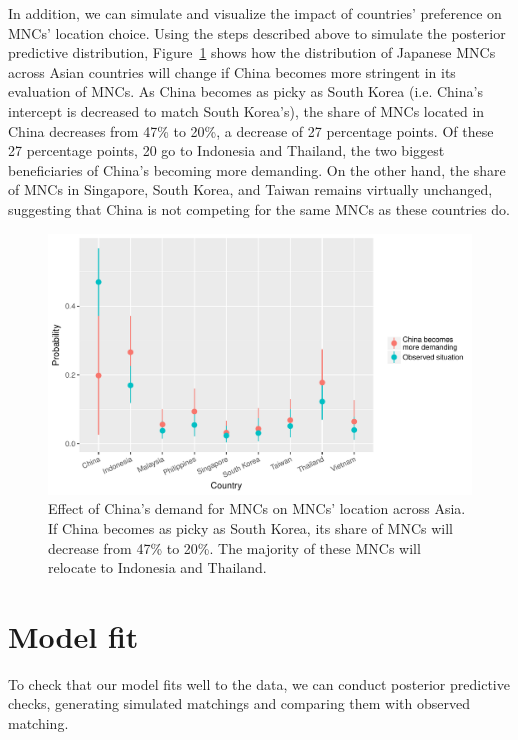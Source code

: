 In addition, we can simulate and visualize the impact of countries'
preference on MNCs' location choice. Using the steps described above to simulate
the posterior predictive distribution,
Figure~\ref{fig:japan96_sim_china_more_demanding} shows how the distribution of
Japanese MNCs across Asian countries will change if China becomes more stringent
in its evaluation of MNCs. As China becomes as picky as South Korea (i.e.
China's intercept is decreased to match South Korea's), the share of MNCs
located in China decreases from 47\% to 20\%, a decrease of 27 percentage
points. Of these 27 percentage points, 20 go to Indonesia and Thailand, the two
biggest beneficiaries of China's becoming more demanding. On the other hand, the
share of MNCs in Singapore, South Korea, and Taiwan remains virtually unchanged,
suggesting that China is not competing for the same MNCs as these countries do.

\begin{figure}[!ht]
  \centering
  \includegraphics[width=\textwidth,keepaspectratio]{../figure/japan96_sim_china_more_demanding}
  \caption[Effect of China's demand for MNCs on MNCs' location across
  Asia.]{Effect of China's demand for MNCs on MNCs' location across Asia. If
    China becomes as picky as South Korea, its share of MNCs will decrease from
    47\% to 20\%. The majority of these MNCs will relocate to Indonesia and Thailand.}
  \label{fig:japan96_sim_china_more_demanding}
\end{figure}

\section{Model fit}
\label{sec:model_fit}

To check that our model fits well to the data, we can conduct posterior
predictive checks, generating simulated matchings and comparing them with observed
matching.

